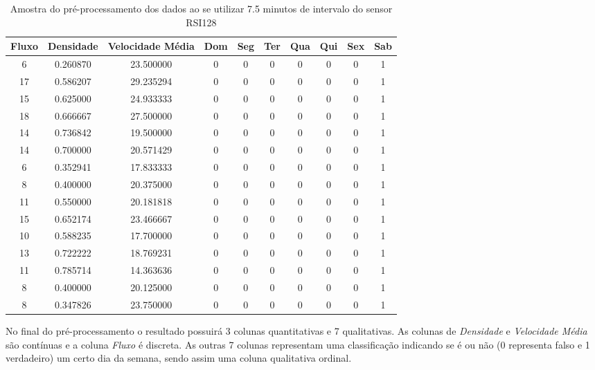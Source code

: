 \begin{table}[H]
    \begin{tabular}{cccccccccc}
    \toprule
    \multicolumn{1}{l}{\textbf{Fluxo}} & \multicolumn{1}{l}{\textbf{Densidade}} & \multicolumn{1}{l}{\textbf{Velocidade Média}} & \multicolumn{1}{l}{\textbf{Dom}} &
    \multicolumn{1}{l}{\textbf{Seg}} & \multicolumn{1}{l}{\textbf{Ter}} & \multicolumn{1}{l}{\textbf{Qua}} & \multicolumn{1}{l}{\textbf{Qui}} &
    \multicolumn{1}{l}{\textbf{Sex}} &
    \multicolumn{1}{l}{\textbf{Sab}} \\
    \midrule
     6 & 0.260870 & 23.500000 & 0 & 0 & 0 & 0 & 0 & 0 & 1 \\
    \midrule
    17 & 0.586207 & 29.235294 & 0 & 0 & 0 & 0 & 0 & 0 & 1 \\
    \midrule
    15 & 0.625000 & 24.933333 & 0 & 0 & 0 & 0 & 0 & 0 & 1 \\
    \midrule
    18 & 0.666667 & 27.500000 & 0 & 0 & 0 & 0 & 0 & 0 & 1 \\
    \midrule
    14 & 0.736842 & 19.500000 & 0 & 0 & 0 & 0 & 0 & 0 & 1 \\
    \midrule
    14 & 0.700000 & 20.571429 & 0 & 0 & 0 & 0 & 0 & 0 & 1 \\
    \midrule
     6 & 0.352941 & 17.833333 & 0 & 0 & 0 & 0 & 0 & 0 & 1 \\
    \midrule
     8 & 0.400000 & 20.375000 & 0 & 0 & 0 & 0 & 0 & 0 & 1 \\
    \midrule
    11 & 0.550000 & 20.181818 & 0 & 0 & 0 & 0 & 0 & 0 & 1 \\
    \midrule
    15 & 0.652174 & 23.466667 & 0 & 0 & 0 & 0 & 0 & 0 & 1 \\
    \midrule
    10 & 0.588235 & 17.700000 & 0 & 0 & 0 & 0 & 0 & 0 & 1 \\
    \midrule
    13 & 0.722222 & 18.769231 & 0 & 0 & 0 & 0 & 0 & 0 & 1 \\
    \midrule
    11 & 0.785714 & 14.363636 & 0 & 0 & 0 & 0 & 0 & 0 & 1 \\
    \midrule
     8 & 0.400000 & 20.125000 & 0 & 0 & 0 & 0 & 0 & 0 & 1 \\
    \midrule
     8 & 0.347826 & 23.750000 & 0 & 0 & 0 & 0 & 0 & 0 & 1 \\
    \bottomrule
    \end{tabular}
    \label{table:data_pre}
    \caption{Amostra do pré-processamento dos dados ao se utilizar 7.5 minutos de intervalo do sensor RSI128}
\end{table}

No final do pré-processamento o resultado possuirá 3 colunas quantitativas e 7 qualitativas. As colunas de \textit{Densidade} e \textit{Velocidade Média} são contínuas e a coluna \textit{Fluxo} é discreta. As outras 7 colunas representam uma classificação indicando se é ou não (0 representa falso e 1 verdadeiro) um certo dia da semana, sendo assim uma coluna qualitativa ordinal.

